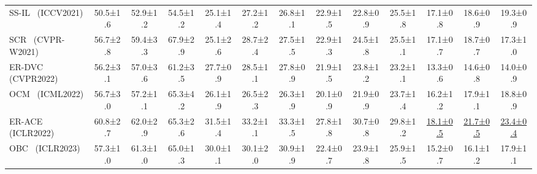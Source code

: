 \begin{table}[t]
\begin{tabular}{l|ccc|ccc|ccc|ccc}
SS-IL~\cite{ahn2021ss} (ICCV2021) & 50.5\scriptsize±1.6& 52.9\scriptsize±1.2                 & 54.5\scriptsize±1.2                 & 25.1\scriptsize±1.4                  & 27.2\scriptsize±1.2                  & 26.8\scriptsize±1.1 & 22.9\scriptsize±1.5                   & 22.8\scriptsize±0.9                  & 25.5\scriptsize±1.8 & 17.1\scriptsize±0.8                   & 18.6\scriptsize±0.9                  & 19.3\scriptsize±0.9\\
SCR~\cite{mai2021supervised} (CVPR-W2021) & 56.7\scriptsize±2.8& 59.4\scriptsize±3.3                 & 67.9\scriptsize±2.9                 & 25.1\scriptsize±2.6                  & 28.7\scriptsize±2.4                  & 27.5\scriptsize±1.5 & 22.9\scriptsize±1.3                   & 24.5\scriptsize±1.8                  & 25.5\scriptsize±1.1 & 17.1\scriptsize±0.7                   & 18.7\scriptsize±0.7                  & 17.3\scriptsize±1.0\\
ER-DVC~\cite{gu2022not} (CVPR2022) & 56.2\scriptsize±3.1& 57.0\scriptsize±3.6                 & 61.2\scriptsize±3.5                 & 27.7\scriptsize±0.9                  & 28.5\scriptsize±1.1                  & 27.8\scriptsize±0.9 & 21.9\scriptsize±1.5                   & 23.8\scriptsize±1.2                  & 23.2\scriptsize±1.1 & 13.3\scriptsize±0.6                   & 14.6\scriptsize±0.8                  & 14.0\scriptsize±0.9\\
OCM~\cite{guo2022online} (ICML2022) & 56.7\scriptsize±3.0& 57.2\scriptsize±1.1                 & 65.3\scriptsize±4.2                 & 26.1\scriptsize±1.9                  & 26.5\scriptsize±2.3                  & 26.3\scriptsize±1.9 & 20.1\scriptsize±0.9                   & 21.9\scriptsize±0.9                  & 23.7\scriptsize±1.4 & 16.2\scriptsize±1.2                   & 17.9\scriptsize±1.1                  & 18.8\scriptsize±0.9\\
ER-ACE~\cite{caccia2021new} (ICLR2022)   & {60.8\scriptsize±2.7}& {62.0\scriptsize±2.9}                 & {65.3\scriptsize±2.6}                 & {31.5\scriptsize±1.4}                  & {33.2\scriptsize±1.1}                  & {33.3\scriptsize±1.5} & {27.8\scriptsize±1.8}                   & {30.7\scriptsize±0.8}                  & {29.8\scriptsize±1.2} & \underline{18.1\scriptsize±0.5}                   & \underline{21.7\scriptsize±0.5}                  & \underline{23.4\scriptsize±0.4}\\
OBC~\cite{chrysakisonline} (ICLR2023)   & 57.3\scriptsize±1.0& 61.3\scriptsize±1.0                 & 65.0\scriptsize±1.3                 & 30.0\scriptsize±1.1                  & 30.1\scriptsize±2.0                  & 30.9\scriptsize±1.9 & 22.4\scriptsize±0.7                   & 23.9\scriptsize±1.8                  & 25.9\scriptsize±1.5 & 15.2\scriptsize±0.7                   & 16.1\scriptsize±1.2                  & 17.9\scriptsize±1.1\\

\end{tabular}
\end{table}
